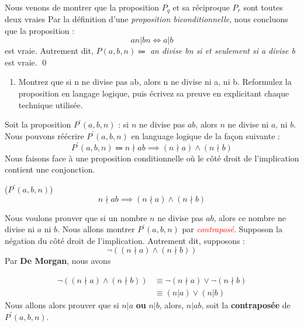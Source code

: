 \documentclass[16pt]{report}
\begin{document}
\begin{multicols*}{2}
    \paragraph{}
    Nous venons de montrer que la proposition $P_q$ et sa réciproque $P_r$ sont toutes deux vraies 
    Par la définition d'une \textit{proposition biconditionnelle}, nous concluons que la proposition :
                        \[ an|bn \Leftrightarrow  a|b \]
    est vraie. Autrement dit, $P(a,b,n) \Coloneqq$ \textit{an divise bn si et seulement si a divise b }
    est vraie. \qed
    

    \begin{enumerate}
        \item[2.] Montrez que si n ne divise pas ab, alors n ne divise ni a, ni b.
            Reformulez la proposition en langage logique, puis écrivez sa preuve en explicitant
            chaque technique utilisée.
    \end{enumerate}

    Soit la proposition $P^{\prime}(a,b, n)$ : si $n$ ne divise pas $ab$, alors $n$ ne divise 
    ni $a$, ni $b$. Nous pouvons réécrire $P^{\prime}(a,b, n)$ en language logique de la façon suivante : 
                        \[ P^{\prime}(a,b, n) \Coloneqq  n \nmid ab \implies  (n \nmid a) \land (n \nmid b) \]
    Nous faisons face à une proposition conditionnelle où le côté droit de l'implication contient 
    une conjonction.

    \begin{prop}{($P^{\prime}(a,b, n)$)}{}
        \[ n \nmid ab \implies  (n \nmid a) \land (n \nmid b) \]
    \end{prop}

    \begin{Preuve*}{}{}
        Nous voulons prouver que si un nombre $n$ ne divise pas $ab$, alors ce nombre ne divise ni $a$ ni $b$. 
        Nous allons montrer $P^{\prime}(a,b, n)$ par \textcolor{red}{\textit{contraposé}}. Supposon la négation 
        du côté droit de l'implication. Autrement dit, supposons :
        \[ \neg \left( (n \nmid a) \land (n \nmid b) \right) \]
        Par \textbf{De Morgan}, nous avons 

        \begin{align*}
            \neg \left( (n \nmid a) \land (n \nmid b) \right) &\equiv  \neg (n \nmid a) \lor \neg (n \nmid b)
                    \\ 
                                  &\equiv  (n | a) \lor (n | b)
        \end{align*}
        Nous allons alors prouver que si $n|a$ \textbf{ou} $n|b$, alors, $n|ab$, soit la \textbf{contraposée} de 
        $P^{\prime}(a,b, n)$. 


\end{Preuve*}
\end{multicols*}
\end{document}

